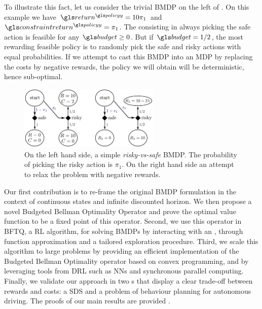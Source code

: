 To illustrate this fact, let us consider the trivial \gls{BMDP} on the left of .
On this example we have $\return^{\policy}=10\pi_1$ and $\constraintreturn^{\policy}=\pi_1$. The  consisting in always picking the safe action is feasible for any $\budget\geq 0$. But if $\budget=1/2$, the most rewarding feasible policy is to randomly pick the safe and risky actions with equal probabilities.
If we attempt to cast this \gls{BMDP} into an MDP by replacing the costs by negative rewards, the policy we will obtain will be deterministic, hence sub-optimal.
%
\begin{figure}
    \centering
    \includegraphics[width=0.6\textwidth]{sources/contribution/nips/source/img/SafeRiskyExample}
    \caption[Example of relaxed Budgeted Markov Decision Process]{On the left hand side, a simple \textit{risky-vs-safe} \gls{BMDP}. The probability of picking the risky action is $\pi_1$. On the right hand side an attempt to relax the problem with negative rewards.}
    \label{fig:stochasticneeded}
\end{figure}

Our first contribution is to re-frame the original \gls{BMDP} formulation in the context of continuous states and infinite discounted horizon. We then propose a novel Budgeted Bellman Optimality Operator and prove the optimal value function to be a fixed point of this operator. Second, we use this operator in \gls{BFTQ}, a  \gls{RL} algorithm, for solving \glspl{BMDP}  by interacting with an , through function approximation and a tailored exploration procedure. Third, we scale this algorithm to large problems by providing an efficient implementation of the Budgeted Bellman Optimality operator based on convex programming, and by leveraging tools from \gls{DRL} such as \glspl{NN} and synchronous parallel computing. Finally, we validate our approach in two s that display a clear trade-off between rewards and costs: a \gls{SDS} and a problem of behaviour planning for autonomous driving. The proofs of our main results are provided .

